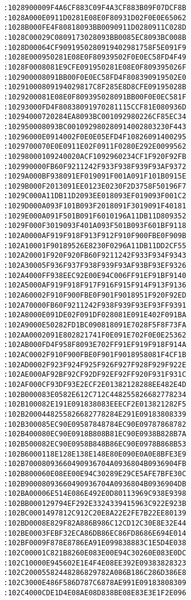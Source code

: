 \begin{lstlisting}[language={}, basicstyle=\scriptsize, caption=Машинний код]
:1028900009F4A6CF883C09F4A3CF883B09F07DCF8B
:1028A000E0911D0281E08E0F80931D02F0E0E65062
:1028B000FE4F80818093BB0090911D0280911C028D
:1028C00029C0809173028093BB0085EC8093BC008B
:1028D00064CF9091950280919402981758F5E091F9
:1028E000950281E08E0F80939502F0E0EC58FD4F49
:1028F0008081E9CFE091950281E08E0F809395026F
:102900008091BB00F0E0EC58FD4F808390919502E0
:10291000809194029817C8F285E8D8CFE09195028B
:1029200081E08E0F809395028091BB00F0E0EC581F
:10293000FD4F80838091970281115CCF81E080936D
:10294000720284EA8093BC001092980226CF85EC34
:102950008093BC001092980280914002803230F443
:10296000E0914002F0E0E05EFD4F10826091400295
:1029700070E0E0911E02F0911F0280E292E0099562
:10298000109240020ACF1092960234CF1F920F92FB
:102990000FB60F9211242F933F938F939F93AF9372
:1029A000BF938091EF019091F001A091F101B0915E
:1029B000F2013091EE0123E0230F2D3758F50196F7
:1029C000A11DB11D2093EE018093EF019093F001C2
:1029D000A093F101B093F2018091F3019091F40181
:1029E000A091F501B091F6010196A11DB11D809352
:1029F000F3019093F401A093F501B093F601BF9118
:102A0000AF919F918F913F912F910F900FBE0F909B
:102A10001F90189526E8230F0296A11DB11DD2CF55
:102A20001F920F920FB60F9211242F933F934F9343
:102A30005F936F937F938F939F93AF93BF93EF9326
:102A4000FF938EEC92E00E94C006FF91EF91BF9140
:102A5000AF919F918F917F916F915F914F913F9136
:102A60002F910F900FBE0F901F9018951F920F92ED
:102A70000FB60F9211242F938F939F93EF93FF9391
:102A8000E091DE02F091DF028081E091E402F091BA
:102A9000E50282FD1BC090818091E7028F5F8F73FA
:102AA0002091E802821741F0E091E702F0E0E25362
:102AB000FD4F958F8093E702FF91EF919F918F914A
:102AC0002F910F900FBE0F901F9018958081F4CF1B
:102AD0002F923F924F925F926F927F928F929F922E
:102AE000AF92BF92CF92DF92EF92FF920F931F931C
:102AF000CF93DF93E2ECF2E01382128288EE482E4D
:102B000083E0582E612C712C448255826682778234
:102B100082E191E091838083EEECF2E013821282F5
:102B2000448255826682778284E291E09183808339
:102B300085EC90E09587848784EC90E09787868782
:102B400080EC90E0918B808B81EC90E0938B828B7A
:102B500082EC90E0958B848B86EC90E0978B868B53
:102B6000118E128E138E148E80E090E0A0E8BFE3E9
:102B70008093660490936704A0936804B0936904FB
:102B800060E08EE00E94C30289E29CE5AFE7BFE30C
:102B90008093660490936704A0936804B0936904DB
:102BA00006E514E086E492E0D80113969C938E9398
:102BB000129794EF292E3324339415963C922E923B
:102BC0001497812C912C20E8A22E2FE7B22EE80139
:102BD0008E829F82A886B986C12CD12C30E8E32E44
:102BE0003FEBF32ECA86DB86EC86FD8686E694E014
:102BF0009F878E8786EA91E099838883C1E5D4E038
:102C00001C821B8260E083E00E94C30260E083E0DC
:102C10000E945602E1E4F4E08EE392E09383828323
:102C20005582448286829782A086B186C286D386E8
:102C3000E486F586D787C6878AE991E09183808309
:102C4000CDE1D4E08AE08D838BE08E83E3E1F2E096

\end{lstlisting}
